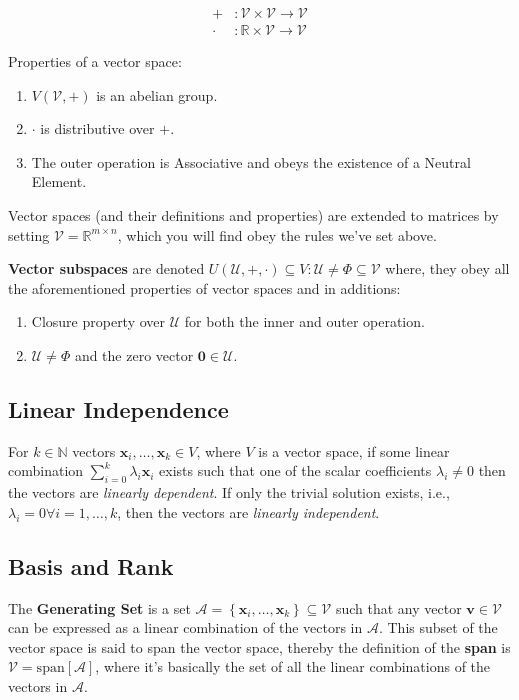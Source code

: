 \begin{align}
    + &: \mathcal{V \times V \rightarrow V}\\
    \cdot &: \mathbb{R} \times \mathcal{V \rightarrow V}
\end{align}

Properties of a vector space:

\begin{enumerate}
    \item $V(\mathcal{V}, +)$ is an abelian group.
    \item $\cdot$ is distributive over $+$.
    \item The outer operation is Associative and obeys the existence of a Neutral Element.
\end{enumerate}

Vector spaces (and their definitions and properties) are extended to matrices by setting $\mathcal{V} = \mathbb{R} ^ {m \times n}$, which you will find obey the rules we've set above.

\textbf{Vector subspaces} are denoted ${U (\mathcal{U}, +, \cdot)} \subseteq V : \mathcal{U \neq \Phi \subseteq V}$ where, they obey all the aforementioned properties of vector spaces and in additions:

\begin{enumerate}
    \item Closure property over $\mathcal{U}$ for both the inner and outer operation.
    \item $\mathcal{U} \neq \Phi$ and the zero vector $\bm{0} \in \mathcal{U}$.
\end{enumerate}

\subsection{Linear Independence}

For $k \in \mathbb{N}$ vectors $\bm{x}_i, \hdots, \bm{x}_k \in V$, where $V$ is a vector space, if some linear combination $\sum_{i=0}^{k} \lambda_i \bm{x}_i$ exists such that one of the scalar coefficients $\lambda_i \neq 0$ then the vectors are \textit{linearly dependent}. If only the trivial solution exists, i.e., $\lambda_i = 0 \forall i=1,\hdots,k$, then the vectors are \textit{linearly independent}.

\subsection{Basis and Rank}

The \textbf{Generating Set} is a set $\mathcal{A} = \left\{\bm{x}_i, \hdots, \bm{x}_k \right\} \subseteq \mathcal{V}$ such that any vector $\bm{v} \in \mathcal{V}$ can be expressed as a linear combination of the vectors in $\mathcal{A}$. This subset of the vector space is said to span the vector space, thereby the definition of the \textbf{span} is $\mathcal{V} = \text{span}{[\mathcal{A}]}$, where it's basically the set of all the linear combinations of the vectors in $\mathcal{A}$.
